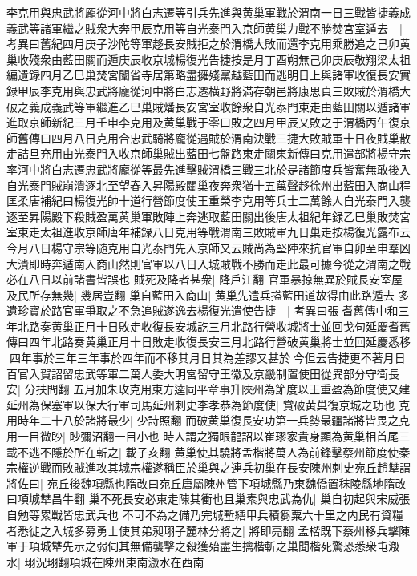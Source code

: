 李克用與忠武將龎從河中將白志遷等引兵先進與黄巢軍戰於渭南一日三戰皆捷義成義武等諸軍繼之賊衆大奔甲辰克用等自光泰門入京師黄巢力戰不勝焚宮室遁去　|{
	考異曰舊紀四月庚子沙陀等軍趍長安賊拒之於渭橋大敗而還李克用乘勝追之己卯黄巢收殘衆由藍田關而遁庚辰收京城楊復光告捷按是月丁酉朔無己卯庚辰敬翔梁太祖編遺録四月乙巳巢焚宮闈省寺居第略盡擁殘黨越藍田而逃明日上與諸軍收復長安實録甲辰李克用與忠武將龐從河中將白志遷横野將滿存朝邑將康思貞三敗賊於渭橋大破之義成義武等軍繼進乙巳巢賊燔長安宮室收餘衆自光泰門東走由藍田關以遁諸軍進取京師新紀三月壬申李克用及黄巢戰于零口敗之四月甲辰又敗之于渭橋丙午復京師舊傳曰四月八日克用合忠武騎將龐從遇賊於渭南決戰三捷大敗賊軍十日夜賊巢散走詰旦充用由光泰門入收京師巢賊出藍田七盤路東走關東新傳曰克用遣部將楊守宗率河中將白志遷忠武將龐從等最先進擊賊渭橋三戰三北於是諸節度兵皆奮無敢後入自光泰門賊崩潰逐北至望春入昇陽殿闥巢夜奔衆猶十五萬聲趍徐州出藍田入商山程匡柔唐補紀曰楊復光帥十道行營節度使王重榮李克用等兵士二萬餘人自光泰門入襲逐至昇陽殿下殺賊盈萬黄巢軍敗陣上奔逃取藍田關出後唐太祖紀年録乙巳巢敗焚宮室東走太祖進收京師唐年補録八日克用等戰渭南三敗賊軍九日巢走按楊復光露布云今月八日楊守宗等随克用自光泰門先入京師又云賊尚為堅陣來抗官軍自卯至申羣凶大潰即時奔遁南入商山然則官軍以八日入城賊戰不勝而走此最可據今從之渭南之戰必在八日以前諸書皆誤也}
賊死及降者甚衆|{
	降戶江翻}
官軍暴掠無異於賊長安室屋及民所存無幾|{
	幾居豈翻}
巢自藍田入商山|{
	黄巢先遣兵搤藍田道故得由此路遁去}
多遺珍寶於路官軍爭取之不急追賊遂逸去楊復光遣使告捷　|{
	考異曰張耆舊傳中和三年北路奏黄巢正月十日敗走收復長安城訖三月北路行營收城將士並回戈句延慶耆舊傳曰四年北路奏黄巢正月十日敗走收復長安三月北路行營破黄巢將士並回延慶悉移四年事於三年三年事於四年而不移其月日其為差謬又甚於今但云告捷更不著月日}
百官入賀詔留忠武等軍二萬人委大明宮留守王徽及京畿制置使田從異部分守衛長安|{
	分扶問翻}
五月加朱玫克用東方逵同平章事升陜州為節度以王重盈為節度使又建延州為保塞軍以保大行軍司馬延州刺史李孝恭為節度使|{
	賞破黄巢復京城之功也}
克用時年二十八於諸將最少|{
	少詩照翻}
而破黄巢復長安功第一兵勢最疆諸將皆畏之克用一目微眇|{
	眇彌沼翻一目小也}
時人謂之獨眼龍詔以崔璆家貴身顯為黄巢相首尾三載不逃不隱於所在斬之|{
	載子亥翻}
黄巢使其驍將孟楷將萬人為前鋒擊蔡州節度使秦宗權逆戰而敗賊進攻其城宗權遂稱臣於巢與之連兵初巢在長安陳州刺史宛丘趙犨謂將佐曰|{
	宛丘後魏項縣也隋改曰宛丘唐屬陳州管下項城縣乃東魏僑置秣陵縣地隋改曰項城犨昌牛翻}
巢不死長安必東走陳其衝也且巢素與忠武為仇|{
	巢自初起與宋威張自勉等累戰皆忠武兵也}
不可不為之備乃完城塹繕甲兵積芻粟六十里之内民有資糧者悉徙之入城多募勇士使其弟昶珝子麓林分將之|{
	將即亮翻}
孟楷既下蔡州移兵擊陳軍于項城犨先示之弱伺其無備襲擊之殺獲殆盡生擒楷斬之巢聞楷死驚恐悉衆屯溵水|{
	珝況珝翻項城在陳州東南溵水在西南}
